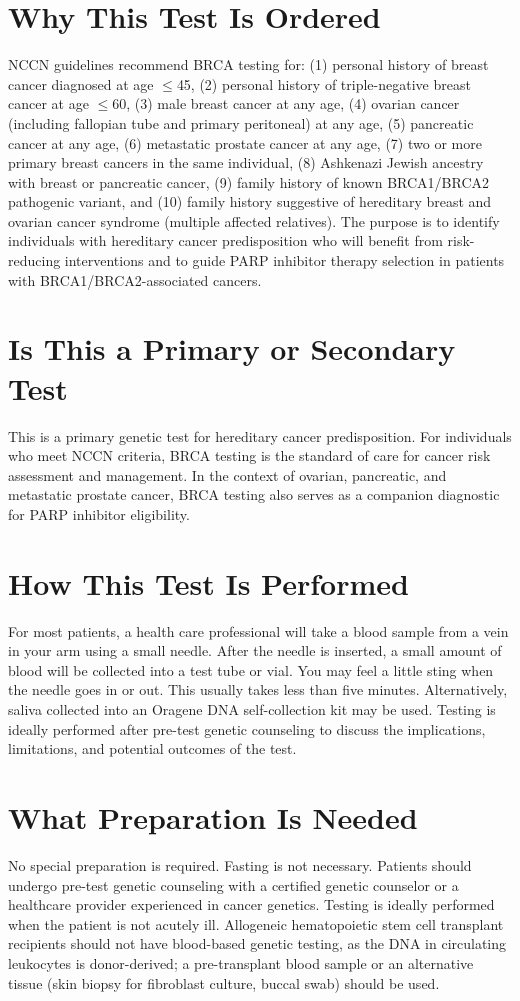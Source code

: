 \section*{Why This Test Is Ordered}
NCCN guidelines recommend BRCA testing for: (1) personal history of breast cancer diagnosed at age $\leq$45, (2) personal history of triple-negative breast cancer at age $\leq$60, (3) male breast cancer at any age, (4) ovarian cancer (including fallopian tube and primary peritoneal) at any age, (5) pancreatic cancer at any age, (6) metastatic prostate cancer at any age, (7) two or more primary breast cancers in the same individual, (8) Ashkenazi Jewish ancestry with breast or pancreatic cancer, (9) family history of known BRCA1/BRCA2 pathogenic variant, and (10) family history suggestive of hereditary breast and ovarian cancer syndrome (multiple affected relatives). The purpose is to identify individuals with hereditary cancer predisposition who will benefit from risk-reducing interventions and to guide PARP inhibitor therapy selection in patients with BRCA1/BRCA2-associated cancers.

\section*{Is This a Primary or Secondary Test}
This is a primary genetic test for hereditary cancer predisposition. For individuals who meet NCCN criteria, BRCA testing is the standard of care for cancer risk assessment and management. In the context of ovarian, pancreatic, and metastatic prostate cancer, BRCA testing also serves as a companion diagnostic for PARP inhibitor eligibility.

\section*{How This Test Is Performed}
For most patients, a health care professional will take a blood sample from a vein in your arm using a small needle. After the needle is inserted, a small amount of blood will be collected into a test tube or vial. You may feel a little sting when the needle goes in or out. This usually takes less than five minutes. Alternatively, saliva collected into an Oragene DNA self-collection kit may be used. Testing is ideally performed after pre-test genetic counseling to discuss the implications, limitations, and potential outcomes of the test.

\section*{What Preparation Is Needed}
No special preparation is required. Fasting is not necessary. Patients should undergo pre-test genetic counseling with a certified genetic counselor or a healthcare provider experienced in cancer genetics. Testing is ideally performed when the patient is not acutely ill. Allogeneic hematopoietic stem cell transplant recipients should not have blood-based genetic testing, as the DNA in circulating leukocytes is donor-derived; a pre-transplant blood sample or an alternative tissue (skin biopsy for fibroblast culture, buccal swab) should be used.

